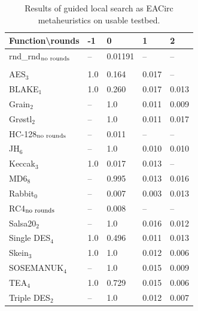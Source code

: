 \documentclass[
    digital,    %
    oneside,    %
    color,
    11pt,
    nocover,
    notable,
    nolof,
    nolot,
]{fithesis3}
\newcommand{\fd}{\cellcolor{red!25}}
\newcommand{\fn}{}
\begin{document}
\begin{table}[H]
\centering
\begin{tabular}{l|l l l l}
\textbf{\large Function\textbackslash{}rounds} & \textbf{\large -1} & \textbf{\large 0} & \textbf{\large 1} & \textbf{\large 2}\\ \hline
rnd\_rnd$_{\textnormal{no rounds}}$ & -- & \fn{}0.01191& --  & --   \\\\
AES$_{3}$        & \fd{}1.0   & \fd{}0.164 & \fn{}0.017 & \fn{}--   \\
BLAKE$_{1}$      & \fd{}1.0   & \fd{}0.260 & \fn{}0.017 & \fn{}0.013\\
Grain$_{2}$      & \fd{}--    & \fd{}1.0   & \fn{}0.011 & \fn{}0.009\\
Gr\o stl$_{2}$   & \fd{}--    & \fd{}1.0   & \fn{}0.011 & \fn{}0.017\\
HC-128$_{\textnormal{no rounds}}$& -- & \fn{}0.011 & -- & --        \\
JH$_{6}$         & \fd{}--    & \fd{}1.0   & \fn{}0.010 & \fn{}0.010\\
Keccak$_{3}$     & \fd{}1.0   & \fn{}0.017 & \fn{}0.013 & \fn{}--   \\
MD6$_{8}$        & \fd{}--    & \fd{}0.995 & \fn{}0.013 & \fn{}0.016\\
Rabbit$_{0}$     &      --    & \fn{}0.007 & \fn{}0.003 & \fn{}0.013\\
RC4$_{\textnormal{no rounds}}$& -- & \fn{}0.008 & --    & --        \\
Salsa20$_{2}$    & \fd{}--    & \fd{}1.0   & \fn{}0.016 & \fn{}0.012\\
Single DES$_{4}$ & \fd{}1.0   & \fd{}0.496 & \fn{}0.011 & \fn{}0.013\\
Skein$_{3}$      & \fd{}1.0   & \fd{}1.0   & \fn{}0.012 & \fn{}0.006\\
SOSEMANUK$_{4}$  & \fd{}--    & \fd{}1.0   & \fn{}0.015 & \fn{}0.009\\
TEA$_{4}$        & \fd{}1.0   & \fd{}0.729 & \fn{}0.015 & \fn{}0.006\\
Triple DES$_{2}$ & \fd{}--    & \fd{}1.0   & \fn{}0.012 & \fn{}0.007
\end{tabular}
\caption{Results of guided local search as EACirc metaheuristics on usable testbed.}
\label{table:res-usable-gls}
\end{table}
\end{document}
